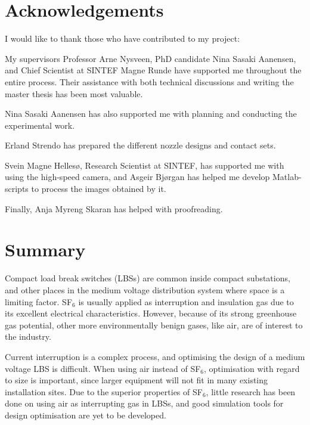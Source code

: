 \documentclass[10pt,b5paper,twoside]{article}
\begin{document}
\thispagestyle{empty}
\cleardoublepage
\section*{Acknowledgements}

I would like to thank those who have contributed to my project:

My supervisors Professor Arne Nysveen, PhD candidate Nina Sasaki Aanensen, and Chief Scientist at SINTEF Magne Runde have supported me throughout the entire process. Their assistance with both technical discussions and writing the master thesis has been most valuable.

Nina Sasaki Aanensen has also supported me with planning and conducting the experimental work.

Erland Strendo has prepared the different nozzle designs and contact sets.

Svein Magne Hellesø, Research Scientist at SINTEF, has supported me with using the high-speed camera, and Asgeir Bjørgan has helped me develop Matlab-scripts to process the images obtained by it.

Finally, Anja Myreng Skaran has helped with proofreading.


\setcounter{page}{1}

\cleardoublepage
\section*{Summary}

Compact load break switches (LBSs) are common inside compact substations, and other places in the medium voltage distribution system where space is a limiting factor. SF$_6$ is usually applied as interruption and insulation gas due to its excellent electrical characteristics. However, because of its strong greenhouse gas potential, other more environmentally benign gases, like air, are of interest to the industry.

Current interruption is a complex process, and optimising the design of a medium voltage LBS is difficult. When using air instead of SF$_6$, optimisation with regard to size is important, since larger equipment will not fit in many existing installation sites. Due to the superior properties of SF$_6$, little research has been done on using air as interrupting gas in LBSs, and good simulation tools for design optimisation are yet to be developed.
\end{document}
